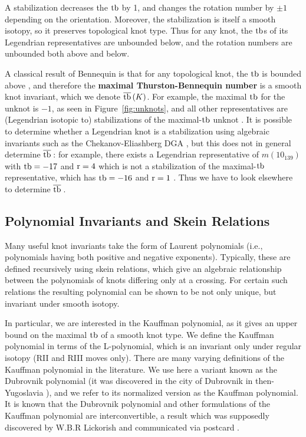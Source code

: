 A stabilization decreases the $\operatorname{tb}$ by 1, and changes the rotation number by $\pm 1$ depending on the orientation. Moreover, the stabilization is itself a smooth isotopy, so it preserves topological knot type. Thus for any knot, the $\operatorname{tb}$s of its Legendrian representatives are unbounded below, and the rotation numbers are unbounded both above and below.

A classical result of Bennequin is that for any topological knot, the $\operatorname{tb}$ is bounded above \cite{bennequin}, and therefore the \textbf{maximal Thurston-Bennequin number} is a smooth knot invariant, which we denote $\overline{\operatorname{tb}}\,(K)$.
For example, the maximal $\operatorname{tb}$ for the unknot is $-1$, as seen in Figure~\ref{fig:unknots}, and all other representatives are (Legendrian isotopic to) stabilizations of the maximal-$\operatorname{tb}$ unknot \cite{atlas}.
It is possible to determine whether a Legendrian knot is a stabilization using algebraic invariants such as the Chekanov-Eliashberg DGA \cite{chekanov}, but this does not in general determine $\overline{\operatorname{tb}}\,$: for example, there exists a Legendrian representative of $m(10_{139})$ with $\operatorname{tb} = -17$ and $\operatorname{r} = 4$ which is not a stabilization of the maximal-$\operatorname{tb}$ representative, which has $\operatorname{tb} = -16$ and $\operatorname{r} = 1$ \cite{atlas}. Thus we have to look elsewhere to determine $\overline{\operatorname{tb}}\,$.

\subsection{Polynomial Invariants and Skein Relations}\label{subsec:kauffman}

Many useful knot invariants take the form of Laurent polynomials (i.e., polynomials having both positive and negative exponents). Typically, these are defined recursively using skein relations, which give an algebraic relationship between the polynomials of knots differing only at a crossing. For certain such relations the resulting polynomial can be shown to be not only unique, but invariant under smooth isotopy.

In particular, we are interested in the Kauffman polynomial, as it gives an upper bound on the maximal $\operatorname{tb}$ of a smooth knot type. We define the Kauffman polynomial in terms of the L-polynomial, which is an invariant only under regular isotopy (RII and RIII moves only).
There are many varying definitions of the Kauffman polynomial in the literature. We use here a variant known as the Dubrovnik polynomial (it was discovered in the city of Dubrovnik in then-Yugoslavia \cite{kauffman}), and we refer to its normalized version as the Kauffman polynomial. 
It is known that the Dubrovnik polynomial and other formulations of the Kauffman polynomial are interconvertible, a result which was supposedly discovered by W.B.R Lickorish and communicated via postcard \cite{kauffman}.

